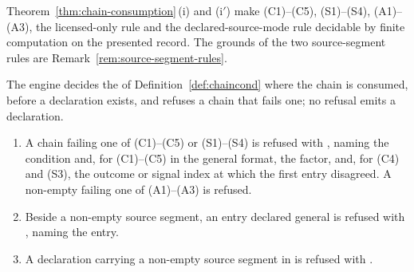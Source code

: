 
Theorem~\ref{thm:chain-consumption}\,(i) and (i$'$) make (C1)--(C5),
(S1)--(S4), (A1)--(A3), the licensed-only rule and the declared-source-mode
rule decidable by finite computation on the presented record. The grounds of
the two source-segment rules are Remark~\ref{rem:source-segment-rules}.

\begin{requirement}\label{req:chain-refusals}
The engine decides the  of
Definition~\ref{def:chaincond} where the chain is consumed, before a
declaration exists, and refuses a chain that fails one; no refusal emits a
declaration.
\begin{enumerate}[label=(\roman*),leftmargin=2.2em]
\item A chain failing one of (C1)--(C5) or (S1)--(S4) is refused with
  , naming the condition and, for
  (C1)--(C5) in the general format, the factor, and, for (C4) and (S3), the outcome or
  signal index at which the first entry disagreed. A non-empty
   failing one of (A1)--(A3) is refused.
\item Beside a non-empty source segment, an entry declared general is refused
  with , naming the entry.
\item A declaration carrying a non-empty source segment in
   is refused with
  .
\end{enumerate}
\end{requirement}
